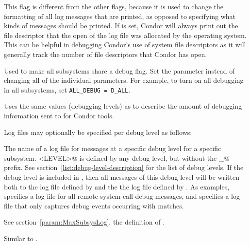 \begin{description}
\begin{description}
  \label{dflag:fds}
  \item[\Dflag{FDS}]
    This flag is different from the other flags, because it is
    used to change the formatting of all log messages that are printed,
    as opposed to specifying what kinds of messages should be printed.
    If  is set, Condor will always print out the file descriptor
    that the open of the log file was allocated by the operating system.
    This can be helpful in debugging Condor's use of system file
    descriptors as it will generally track the number of file descriptors
    that Condor has open.

    
  \end{description}

\label{param:AllDebug}
\item[\Macro{ALL\_DEBUG}]
  Used to make all subsystems
  share a debug flag. Set the parameter 
  instead of changing all of the individual parameters.  For example,
  to turn on all debugging in all subsystems, set
  \verb$ALL_DEBUG = D_ALL$.

\label{param:ToolDebug}
\item[\Macro{TOOL\_DEBUG}]
  Uses the same values (debugging levels) as  to
  describe the amount of debugging information sent to  
  for Condor tools.

\end{description}

Log files may optionally be specified per debug level as follows:
\begin{description}

\label{param:SubsysLevelLog}
\item[\MacroB{<SUBSYS>\_<LEVEL>\_LOG}]
  The name of a log file for messages at a specific debug level for a
  specific subsystem.  
  \verb@<LEVEL>@ is defined by any debug level,
  but without the \verb@D_@ prefix.
  See section~\ref{list:debug-level-description} for the list of debug levels.
  If the debug level is included in
  , then all messages of this debug level will be
  written both to the log file defined by  and the
  the log file defined by .  As examples,
   specifies a log file for all remote
  system call debug messages,
  and  specifies a log file that only captures
   debug events occurring with matches.

\label{param:MaxSubsysLevelLog}
\item[\Macro{MAX\_<SUBSYS>\_<LEVEL>\_LOG}]
  See section~\ref{param:MaxSubsysLog}, the definition of
  .

\label{param:TruncSubsysLevelLogOnOpen}
\item[\Macro{TRUNC\_<SUBSYS>\_<LEVEL>\_LOG\_ON\_OPEN}]
  Similar to .

\end{description}


